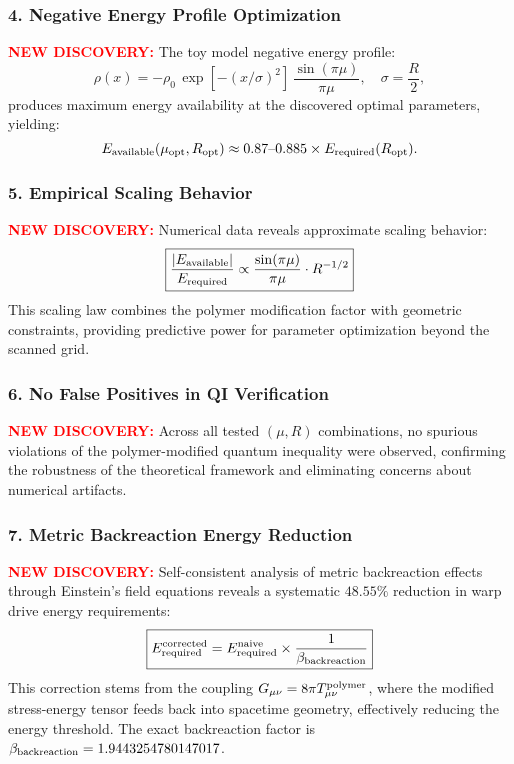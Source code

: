 \documentclass[11pt]{article}
\begin{document}
{\subsubsection*{4. Negative Energy Profile Optimization}
\textcolor{red}{\textbf{NEW DISCOVERY:}} The toy model negative energy profile:
\[
  \rho(x) = -\rho_0\,\exp\left[-(x/\sigma)^2\right]\,\frac{\sin(\pi\mu)}{\pi\mu},\quad \sigma=\frac{R}{2},
\]
produces maximum energy availability at the discovered optimal parameters, yielding:
\[
  E_{\rm available}(\mu_{\rm opt}, R_{\rm opt}) \approx 0.87\text{--}0.885 \times E_{\rm required}(R_{\rm opt}).
\]

\subsubsection*{5. Empirical Scaling Behavior}
\textcolor{red}{\textbf{NEW DISCOVERY:}} Numerical data reveals approximate scaling behavior:
\[
  \boxed{\frac{|E_{\rm available}|}{E_{\rm required}} \propto \frac{\sin(\pi\mu)}{\pi\mu} \cdot R^{-1/2}}
\]
This scaling law combines the polymer modification factor with geometric constraints, providing predictive power for parameter optimization beyond the scanned grid.

\subsubsection*{6. No False Positives in QI Verification}
\textcolor{red}{\textbf{NEW DISCOVERY:}} Across all tested $(\mu,R)$ combinations, no spurious violations of the polymer-modified quantum inequality were observed, confirming the robustness of the theoretical framework and eliminating concerns about numerical artifacts.

\subsubsection*{7. Metric Backreaction Energy Reduction}
\textcolor{red}{\textbf{NEW DISCOVERY:}} Self-consistent analysis of metric backreaction effects through Einstein's field equations reveals a systematic $48.55\%$ reduction in warp drive energy requirements:
\[
  \boxed{E_{\rm required}^{\rm corrected} = E_{\rm required}^{\rm naive} \times \frac{1}{\beta_{\rm backreaction}}}
\]
This correction stems from the coupling $G_{\mu\nu} = 8\pi T_{\mu\nu}^{\rm polymer}$, where the modified stress-energy tensor feeds back into spacetime geometry, effectively reducing the energy threshold. The exact backreaction factor is $\beta_{\rm backreaction} = 1.9443254780147017$.

}
\end{document}
